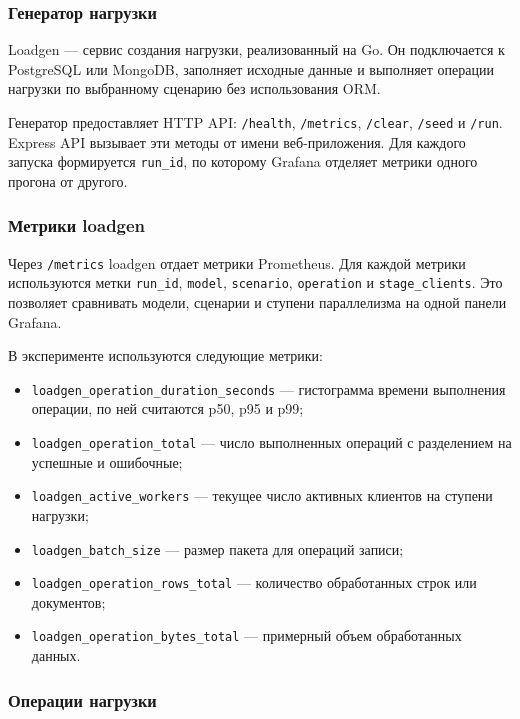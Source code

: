 \subsubsection{Генератор нагрузки}

Loadgen --- сервис создания нагрузки, реализованный на Go. Он подключается к
PostgreSQL или MongoDB, заполняет исходные данные и выполняет операции
нагрузки по выбранному сценарию без использования ORM.

Генератор предоставляет HTTP API: \texttt{/health}, \texttt{/metrics},
\texttt{/clear}, \texttt{/seed} и \texttt{/run}. Express API вызывает эти
методы от имени веб-приложения. Для каждого запуска формируется \texttt{run\_id},
по которому Grafana отделяет метрики одного прогона от другого.

\subsubsection{Метрики loadgen}

Через \texttt{/metrics} loadgen отдает метрики Prometheus. Для каждой метрики
используются метки \texttt{run\_id}, \texttt{model}, \texttt{scenario},
\texttt{operation} и \texttt{stage\_clients}. Это позволяет сравнивать модели,
сценарии и ступени параллелизма на одной панели Grafana.

В эксперименте используются следующие метрики:

\begin{itemize}
  \item \texttt{loadgen\_operation\_duration\_seconds} --- гистограмма времени
        выполнения операции, по ней считаются p50, p95 и p99;
  \item \texttt{loadgen\_operation\_total} --- число выполненных операций с
        разделением на успешные и ошибочные;
  \item \texttt{loadgen\_active\_workers} --- текущее число активных клиентов
        на ступени нагрузки;
  \item \texttt{loadgen\_batch\_size} --- размер пакета для операций записи;
  \item \texttt{loadgen\_operation\_rows\_total} --- количество обработанных
        строк или документов;
  \item \texttt{loadgen\_operation\_bytes\_total} --- примерный объем
        обработанных данных.
\end{itemize}

\subsubsection{Операции нагрузки}


